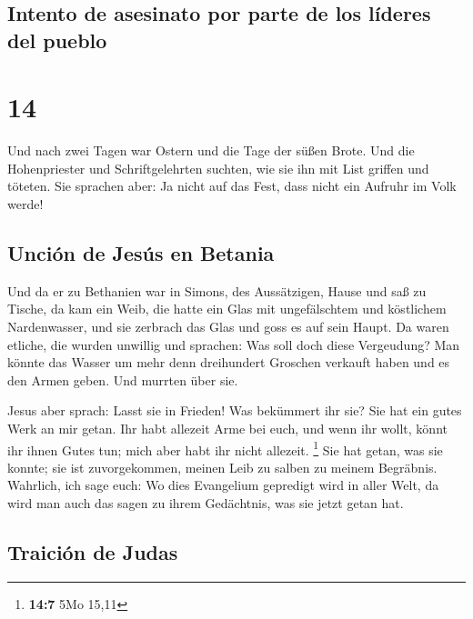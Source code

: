\hypertarget{intento-de-asesinato-por-parte-de-los-luxedderes-del-pueblo}{%
\subsection{Intento de asesinato por parte de los líderes del
pueblo}\label{intento-de-asesinato-por-parte-de-los-luxedderes-del-pueblo}}

\hypertarget{section-13}{%
\section{14}\label{section-13}}

 Und nach zwei Tagen war Ostern und die Tage der süßen
Brote. Und die Hohenpriester und Schriftgelehrten suchten, wie sie ihn
mit List griffen und töteten.  Sie sprachen aber: Ja nicht
auf das Fest, dass nicht ein Aufruhr im Volk werde!

\hypertarget{unciuxf3n-de-jesuxfas-en-betania}{%
\subsection{Unción de Jesús en
Betania}\label{unciuxf3n-de-jesuxfas-en-betania}}

 Und da er zu Bethanien war in Simons, des Aussätzigen,
Hause und saß zu Tische, da kam ein Weib, die hatte ein Glas mit
ungefälschtem und köstlichem Nardenwasser, und sie zerbrach das Glas und
goss es auf sein Haupt.  Da waren etliche, die wurden
unwillig und sprachen: Was soll doch diese Vergeudung? 
Man könnte das Wasser um mehr denn dreihundert Groschen verkauft haben
und es den Armen geben. Und murrten über sie.

 Jesus aber sprach: Lasst sie in Frieden! Was bekümmert
ihr sie? Sie hat ein gutes Werk an mir getan.  Ihr habt
allezeit Arme bei euch, und wenn ihr wollt, könnt ihr ihnen Gutes tun;
mich aber habt ihr nicht allezeit. \footnote{\textbf{14:7} 5Mo 15,11}
 Sie hat getan, was sie konnte; sie ist zuvorgekommen,
meinen Leib zu salben zu meinem Begräbnis.  Wahrlich, ich
sage euch: Wo dies Evangelium gepredigt wird in aller Welt, da wird man
auch das sagen zu ihrem Gedächtnis, was sie jetzt getan hat.

\hypertarget{traiciuxf3n-de-judas}{%
\subsection{Traición de Judas}\label{traiciuxf3n-de-judas}}


